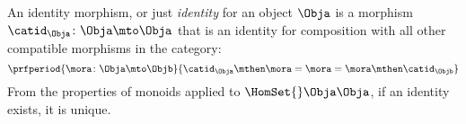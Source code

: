


%
%

\begin{ctdefinition}\label{def:identity-morphism}
    An identity morphism, or just \emph{identity} for an object $\Obja$
    is a morphism $	\catid_{\Obja}\colon \Obja \mto \Obja$ that is an identity for composition with all other compatible morphisms in the category:
    \begin{equation}
        \prfperiod{
            \mora \colon \Obja \mto \Objb
        }{
            \catid_\Obja \mthen \mora= \mora = \mora \mthen \catid_\Objb
        }
    \end{equation}
    From the properties of monoids applied to $\HomSet{}\Obja\Obja$, if an identity exists, it is unique.
\end{ctdefinition}

